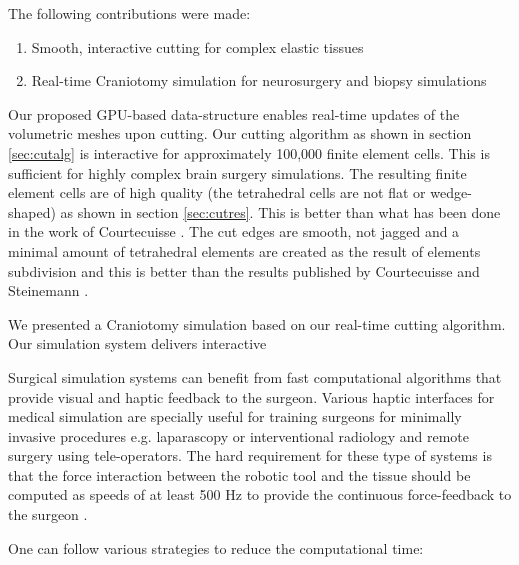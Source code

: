 \label{chapter:conclusion}
The following contributions were made:


\begin{enumerate}
 \item Smooth, interactive cutting for complex elastic tissues 
 \item Real-time Craniotomy simulation for neurosurgery and biopsy simulations
\end{enumerate} 

Our proposed GPU-based data-structure enables real-time updates of the volumetric meshes upon 
cutting. Our cutting algorithm as shown in section \ref{sec:cutalg} is interactive for approximately 100,000 finite 
element cells. This is sufficient for highly complex brain surgery simulations. The resulting finite element 
cells are of high quality (the tetrahedral cells are not flat or wedge-shaped) as shown in section \ref{sec:cutres}. 
This is better than what has been done in the work of Courtecuisse \etal \cite{Courtecuisse2010a}.
The cut edges are smooth, not jagged and a minimal amount of tetrahedral elements are 
created as the result of elements subdivision and this is better than the results published by Courtecuisse
\etal and Steinemann \etal \cite{Courtecuisse2010a, Steinemann}. 

We presented a Craniotomy simulation based on our real-time cutting algorithm. 
Our simulation system delivers interactive 




Surgical simulation systems can benefit from fast computational algorithms that provide visual and haptic feedback to the surgeon. 
Various haptic interfaces for medical simulation are specially useful for training surgeons for minimally invasive procedures e.g.
laparascopy or interventional radiology and remote surgery using tele-operators. The hard requirement for these type of systems is
that the force interaction between the robotic tool and the tissue should be computed as speeds of at least 500 Hz to provide the 
continuous force-feedback to the surgeon \cite{dimaio2005interactive, Otaduy2005}.







One can follow various strategies to reduce the computational time:

